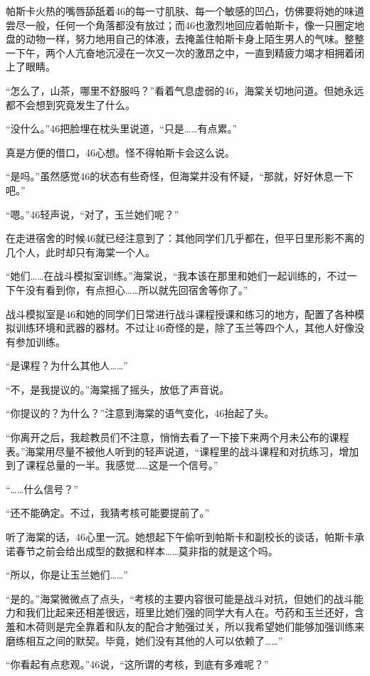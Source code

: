 帕斯卡火热的嘴唇舔舐着46的每一寸肌肤、每一个敏感的凹凸，仿佛要将她的味道尝尽一般，任何一个角落都没有放过；而46也激烈地回应着帕斯卡，像一只圈定地盘的动物一样，努力地用自己的体液，去掩盖住帕斯卡身上陌生男人的气味。整整一下午，两个人亢奋地沉浸在一次又一次的激昂之中，一直到精疲力竭才相拥着闭上了眼睛。

“怎么了，山茶，哪里不舒服吗？”看着气息虚弱的46，海棠关切地问道。但她永远都不会想到究竟发生了什么。

“没什么。”46把脸埋在枕头里说道，“只是……有点累。”

真是方便的借口，46心想。怪不得帕斯卡会这么说。

“是吗。”虽然感觉46的状态有些奇怪，但海棠并没有怀疑，“那就，好好休息一下吧。”

“嗯。”46轻声说，“对了，玉兰她们呢？”

在走进宿舍的时候46就已经注意到了：其他同学们几乎都在，但平日里形影不离的几个人，此时却只有海棠一个人。

“她们……在战斗模拟室训练。”海棠说，“我本该在那里和她们一起训练的，不过一下午没有看到你，有点担心……所以就先回宿舍等你了。”

战斗模拟室是46和她的同学们日常进行战斗课程授课和练习的地方，配置了各种模拟训练环境和武器的器材。不过让46奇怪的是，除了玉兰等四个人，其他人好像没有参加训练。

“是课程？为什么其他人……”

“不，是我提议的。”海棠摇了摇头，放低了声音说。

“你提议的？为什么？”注意到海棠的语气变化，46抬起了头。

“你离开之后，我趁教员们不注意，悄悄去看了一下接下来两个月未公布的课程表。”海棠用尽量不被他人听到的轻声说道，“课程里的战斗课程和对抗练习，增加到了课程总量的一半。我感觉……这是一个信号。”

“……什么信号？”

“还不能确定。不过，我猜考核可能要提前了。”

听了海棠的话，46心里一沉。她想起下午偷听到帕斯卡和副校长的谈话，帕斯卡承诺春节之前会给出成型的数据和样本……莫非指的就是这个吗。

“所以，你是让玉兰她们……”

“是的。”海棠微微点了点头，“考核的主要内容很可能是战斗对抗，但她们的战斗能力和我们比起来还相差很远，班里比她们强的同学大有人在。芍药和玉兰还好，含羞和木荷则是完全靠着和队友的配合才勉强过关，所以我希望她们能够加强训练来磨练相互之间的默契。毕竟，她们没有其他的人可以依赖了……”

“你看起有点悲观。”46说，“这所谓的考核，到底有多难呢？”

